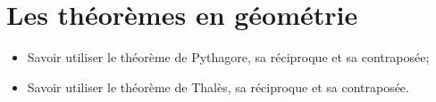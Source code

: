 \chapter{Les théorèmes en géométrie}\label{ChLesTheoremes}

\begin{acquis}
\begin{itemize}
\item Savoir utiliser le théorème de Pythagore, sa réciproque et sa contraposée;
\item Savoir utiliser le théorème de Thalès, sa réciproque et sa contraposée.
\end{itemize}
\end{acquis}



\exercicesbase
\begin{colonne*exercice}

\end{colonne*exercice}




\connaissances




\pagebreak



